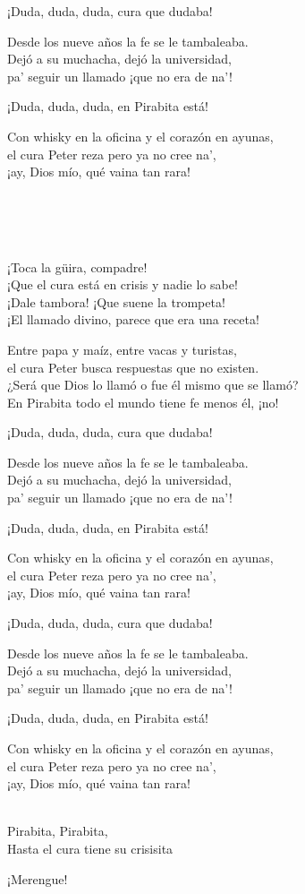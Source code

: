 \begin{lyrics}
¡Duda, duda, duda, cura que dudaba!

Desde los nueve años la fe se le tambaleaba.\\
Dejó a su muchacha, dejó la universidad,\\
pa’ seguir un llamado ¡que no era de na’!

¡Duda, duda, duda, en Pirabita está!

Con whisky en la oficina y el corazón en ayunas,\\
el cura Peter reza pero ya no cree na’,\\
¡ay, Dios mío, qué vaina tan rara!

\\
\\

\\
¡Toca la güira, compadre!\\
¡Que el cura está en crisis y nadie lo sabe!\\
¡Dale tambora! ¡Que suene la trompeta!\\
¡El llamado divino, parece que era una receta!

Entre papa y maíz, entre vacas y turistas,\\
el cura Peter busca respuestas que no existen.\\
¿Será que Dios lo llamó o fue él mismo que se llamó?\\
En Pirabita todo el mundo tiene fe menos él, ¡no!

¡Duda, duda, duda, cura que dudaba!

Desde los nueve años la fe se le tambaleaba.\\
Dejó a su muchacha, dejó la universidad,\\
pa’ seguir un llamado ¡que no era de na’!

¡Duda, duda, duda, en Pirabita está!

Con whisky en la oficina y el corazón en ayunas,\\
el cura Peter reza pero ya no cree na’,\\
¡ay, Dios mío, qué vaina tan rara!

¡Duda, duda, duda, cura que dudaba!

Desde los nueve años la fe se le tambaleaba.\\
Dejó a su muchacha, dejó la universidad,\\
pa’ seguir un llamado ¡que no era de na’!

¡Duda, duda, duda, en Pirabita está!

Con whisky en la oficina y el corazón en ayunas,\\
el cura Peter reza pero ya no cree na’,\\
¡ay, Dios mío, qué vaina tan rara!

\\
Pirabita, Pirabita,\\
Hasta el cura tiene su crisisita 

¡Merengue!
\end{lyrics}

